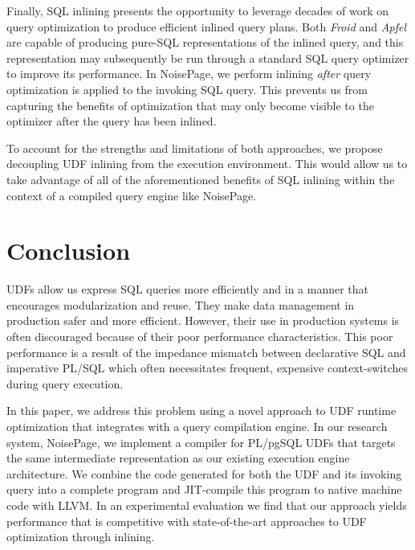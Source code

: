 \documentclass{vldb}
\newcommand{\plpgsql}{PL/pgSQL\xspace}
\begin{document}
Finally, SQL inlining presents the opportunity to leverage decades of work on query optimization to produce efficient inlined query plans. Both \textit{Froid} and \textit{Apfel} are capable of producing pure-SQL representations of the inlined query, and this representation may subsequently be run through a standard SQL query optimizer to improve its performance. In NoisePage, we perform inlining \textit{after} query optimization is applied to the invoking SQL query. This prevents us from capturing the benefits of optimization that may only become visible to the optimizer after the query has been inlined.

To account for the strengths and limitations of both approaches, we propose decoupling UDF inlining from the execution environment. This would allow us to take advantage of all of the aforementioned benefits of SQL inlining within the context of a compiled query engine like NoisePage. 


\section{Conclusion}

UDFs allow us express SQL queries more efficiently and in a manner that encourages modularization and reuse. They make data management in production safer and more efficient. However, their use in production systems is often discouraged because of their poor performance characteristics. This poor performance is a result of the impedance mismatch between declarative SQL and imperative PL/SQL which often necessitates frequent, expensive context-switches during query execution.

In this paper, we address this problem using a novel approach to UDF runtime optimization that integrates with a query compilation engine. In our research system, NoisePage, we implement a compiler for \plpgsql UDFs that targets the same intermediate representation as our existing execution engine architecture. We combine the code generated for both the UDF and its invoking query into a complete program and JIT-compile this program to native machine code with LLVM. In an experimental evaluation we find that our approach yields performance that is competitive with state-of-the-art approaches to UDF optimization through inlining.

\end{document}
